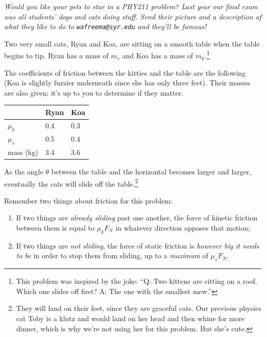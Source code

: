 \documentclass[12pt]{article}
\begin{document}
\Large
\centerline{}
\normalsize
\centerline{}

\begin{center}
{\it Would you like your pets to star in a PHY211 problem? Last year our final exam was all students' dogs and cats doing stuff. Send their picture and a description of what they like to do to {\tt wafreema@syr.edu} and they'll be famous!}
\end{center}


Two very small cats, Ryan and Koa, are sitting on a smooth table when the table begins to tip. Ryan has a mass of $m_r$ and Koa has a mass of $m_k$.\footnote{This problem was inspired by the joke: ``Q: Two kittens are sitting on a roof. Which one slides off first? A: The one with the smallest mew.''}

\begin{minipage}{0.6\textwidth}
The coefficients of friction between the kitties and the table are the following (Koa is slightly fuzzier underneath since she has only three feet). Their masses are also
given; it's up to you to determine if they matter.
\end{minipage}\hspace{0.1\textwidth}
\begin{minipage}{0.3\textwidth}
\begin{tabular}{|l|l|l|}
\hline
        & Ryan & Koa \\ \hline
$\mu_k$ & 0.4  & 0.3  \\ \hline
$\mu_s$ & 0.5  & 0.4  \\ \hline
mass (kg) & 3.4 & 3.6 \\ \hline
\end{tabular}
\end{minipage}

As the angle $\theta$ between the table and the horizontal becomes larger and larger, eventually the cats will slide off the 
table.\footnote{They will land on their feet, since they are graceful cats. Our previous physics cat Toby is a klutz and would land on her head and then whine for more dinner, which is why we're not using her for this problem. But she's cute.}

Remember two things about friction for this problem:

\begin{enumerate}
\item If two things are {\it already sliding} past one another, the force of kinetic friction between them is equal to $\mu_k F_N$ in whatever direction opposes that motion;
\item If two things are {\it not sliding}, the force of static friction is {\it however big it needs to be} in order to stop
them from sliding, up to a {\it maximum} of $\mu_s F_N$.
\end{enumerate}
\end{document}

